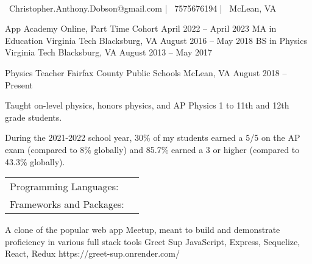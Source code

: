 \documentclass[]{awesome-cv}
\begin{document}
    
\begin{center}
	  \\
	\vspace{2mm}
	{\faEnvelope\ Christopher.Anthony.Dobson@gmail.com} | {\faMobile\ 7575676194} | {\faMapMarker\ McLean, VA}
\end{center}
\begin{cventries}
	\cventry
	{}
	{App Academy}
	{Online, Part Time Cohort}
	{April 2022 – April 2023}
	{}
	\cventry
	{MA in Education}
	{Virginia Tech}
	{Blacksburg, VA}
	{August 2016 – May 2018}
	{}
	\cventry
	{BS in Physics}
	{Virginia Tech}
	{Blacksburg, VA}
	{August 2013 – May 2017}
	{}
\end{cventries}

\vspace{-2mm}
\begin{cventries}
	\cventry
	{Physics Teacher}
	{Fairfax County Public Schools}
	{McLean, VA}
	{August 2018 – Present}
	{\begin{cvitems}
		\item {Taught on-level physics, honors physics, and AP Physics 1 to 11th and 12th grade students.}
		\item {During the 2021-2022 school year, 30\% of my students earned a 5/5 on the AP exam (compared to 8\% globally) and 85.7\% earned a 3 or higher (compared to 43.3\% globally).}
		\end{cvitems}}
\end{cventries}
\begin{cventries}
	\cventry
	{}
	{\def\arraystretch{1.15}{\begin{tabular}{ l l }
		Programming Languages:  & {\skill{ JS and Python -- proficient, Java and C -- novice}} \\
		Frameworks and Packages:  & {\skill{ Express, React/Redux, Sequelize, Flask}} \\
		\end{tabular}}}
	{}
	{}
	{}
\end{cventries}

\vspace{-7mm}
\begin{cventries}
	\cventry
	{A clone of the popular web app Meetup, meant to build and demonstrate proficiency in various full stack tools}
	{Greet Sup}
	{JavaScript, Express, Sequelize, React, Redux}
	{https://greet-sup.onrender.com/}
	{}
	
	\vspace{-5mm}
\end{cventries}

\ 
\end{document}

